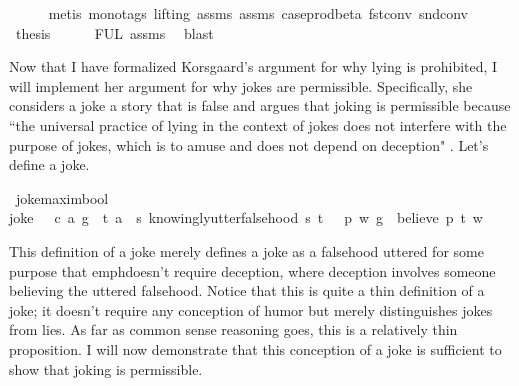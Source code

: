 \begin{isabellebody}
\ \ \ \ \isamarkupfalse%
\ {\isacharparenleft}metis\ {\isacharparenleft}mono{\isacharunderscore}tags{\isacharcomma}\ lifting{\isacharparenright}\ assms{\isacharparenleft}{}{\isacharparenright}\ assms{\isacharparenleft}{}{\isacharparenright}\ case{\isacharunderscore}prod{\isacharunderscore}beta\ fst{\isacharunderscore}conv\ snd{\isacharunderscore}conv{\isacharparenright}\isanewline
\ \ \isamarkupfalse%
\ {\isacharquery}thesis\isanewline
\ \ \ \ \isamarkupfalse%
\ FUL\ assms{\isacharparenleft}{}{\isacharparenright}\ \isamarkupfalse%
\ blast\ \isanewline
{}\isamarkupfalse%
%
\endisatagproof
{\isafoldproof}%
%
\isadelimproof
%
\endisadelimproof
%
\begin{isamarkuptext}%
Now that I have formalized Korsgaard's argument for why lying is prohibited, I will 
implement her argument for why jokes are permissible. Specifically, she considers a joke a story that is 
false and argues that joking is permissible because ``the universal practice of lying in the context of jokes
does not interfere with the purpose of jokes, which is to amuse and does not depend on
deception" \citep[4]{KorsgaardRTL}. Let's define a joke.%
\end{isamarkuptext}\isamarkuptrue%
\isamarkupfalse%
\ joke{\isacharcolon}{\isacharcolon}{\isachardoublequoteopen}maxim{\isasymRightarrow}bool{\isachardoublequoteclose}\ \ \isanewline
{\isachardoublequoteopen}joke\ {\isasymequiv}\ {\isasymlambda}\ {\isacharparenleft}c{\isacharcomma}\ a{\isacharcomma}\ g{\isacharparenright}{\isachardot}\ \ {\isasymexists}t{\isachardot}\ {\isacharparenleft}a\ \isactrlbold {\isasymlongrightarrow}\ {\isacharparenleft}{\isasymlambda}s{\isachardot}\ knowingly{\isacharunderscore}utter{\isacharunderscore}falsehood\ s\ t{\isacharparenright}{\isacharparenright}\ {\isasymand}\ {\isasymnot}\ {\isacharparenleft}{\isasymexists}p{\isachardot}\ {\isasymforall}w{\isachardot}\ {\isacharparenleft}g\ \isactrlbold {\isasymrightarrow}\ {\isacharparenleft}believe\ p\ t{\isacharparenright}{\isacharparenright}\ w{\isacharparenright}{\isachardoublequoteclose}%
\begin{isamarkuptext}%
This definition of a joke merely defines a joke as a falsehood uttered for some purpose that 
emph{doesn't} require deception, where deception involves someone believing the uttered falsehood. Notice 
that this is quite a thin definition of a joke; it doesn't require any conception of humor but merely
distinguishes jokes from lies. As far as common sense reasoning goes, this is a relatively thin proposition. 
I will now demonstrate that this conception of a joke is sufficient to show that joking is permissible.


\end{isamarkuptext}
\end{isabellebody}
